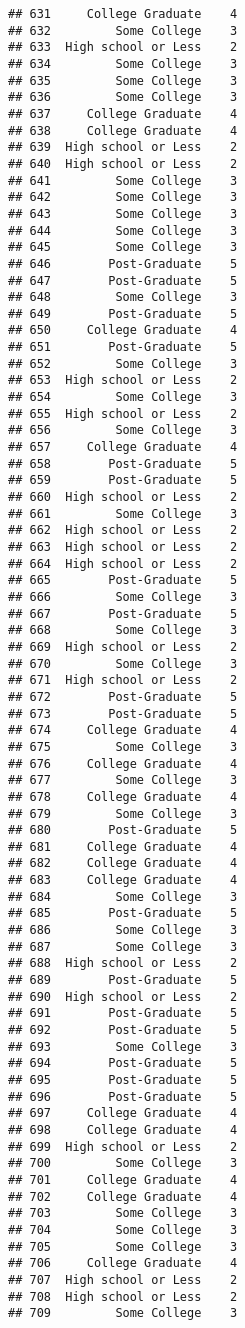 \documentclass[
]{article}
\begin{document}
\begin{verbatim}
## 631     College Graduate    4
## 632         Some College    3
## 633  High school or Less    2
## 634         Some College    3
## 635         Some College    3
## 636         Some College    3
## 637     College Graduate    4
## 638     College Graduate    4
## 639  High school or Less    2
## 640  High school or Less    2
## 641         Some College    3
## 642         Some College    3
## 643         Some College    3
## 644         Some College    3
## 645         Some College    3
## 646        Post-Graduate    5
## 647        Post-Graduate    5
## 648         Some College    3
## 649        Post-Graduate    5
## 650     College Graduate    4
## 651        Post-Graduate    5
## 652         Some College    3
## 653  High school or Less    2
## 654         Some College    3
## 655  High school or Less    2
## 656         Some College    3
## 657     College Graduate    4
## 658        Post-Graduate    5
## 659        Post-Graduate    5
## 660  High school or Less    2
## 661         Some College    3
## 662  High school or Less    2
## 663  High school or Less    2
## 664  High school or Less    2
## 665        Post-Graduate    5
## 666         Some College    3
## 667        Post-Graduate    5
## 668         Some College    3
## 669  High school or Less    2
## 670         Some College    3
## 671  High school or Less    2
## 672        Post-Graduate    5
## 673        Post-Graduate    5
## 674     College Graduate    4
## 675         Some College    3
## 676     College Graduate    4
## 677         Some College    3
## 678     College Graduate    4
## 679         Some College    3
## 680        Post-Graduate    5
## 681     College Graduate    4
## 682     College Graduate    4
## 683     College Graduate    4
## 684         Some College    3
## 685        Post-Graduate    5
## 686         Some College    3
## 687         Some College    3
## 688  High school or Less    2
## 689        Post-Graduate    5
## 690  High school or Less    2
## 691        Post-Graduate    5
## 692        Post-Graduate    5
## 693         Some College    3
## 694        Post-Graduate    5
## 695        Post-Graduate    5
## 696        Post-Graduate    5
## 697     College Graduate    4
## 698     College Graduate    4
## 699  High school or Less    2
## 700         Some College    3
## 701     College Graduate    4
## 702     College Graduate    4
## 703         Some College    3
## 704         Some College    3
## 705         Some College    3
## 706     College Graduate    4
## 707  High school or Less    2
## 708  High school or Less    2
## 709         Some College    3

\end{verbatim}
\end{document}
